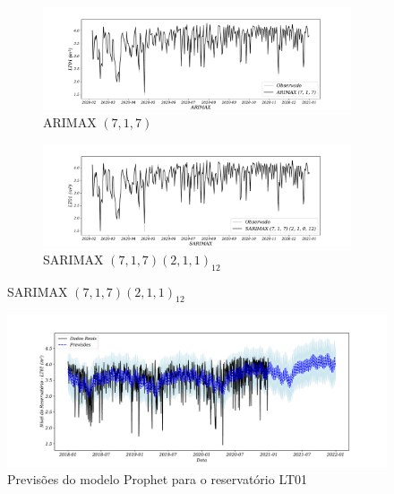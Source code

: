 \begin{figure}[H]
	\centering
	\caption{Comparação entre ARIMAX e SARIMAX}
	\begin{subfigure}{1\textwidth}
			\includegraphics[width=\linewidth]{Modelos/Figuras/ARIMAX}
			\caption{ARIMAX $(7,1,7)$}
			\label{fig:1-arimax}
		\end{subfigure}
	\hfill
	
	\begin{subfigure}{1\textwidth}
			\includegraphics[width=\linewidth]{Modelos/Figuras/SARIMAX}
			\caption{SARIMAX $(7,1,7) (2,1,1)_{12}$}
			\label{fig:1-sarimax}	
		\end{subfigure}

		
\end{figure}






\begin{figure}[H]
	\centering
	\caption{Previsões do modelo Prophet para o reservatório LT01}\label{fig:prophet1}
	\includegraphics[width=1\linewidth]{Apendices/Figuras/modelagem-24h/prophet1}
	
\end{figure}




